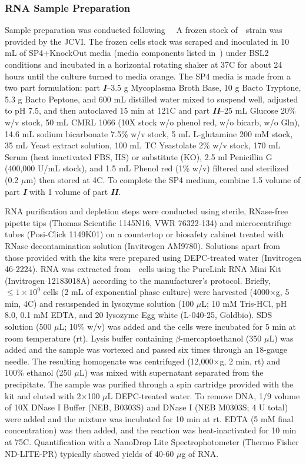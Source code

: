\subsubsection{RNA Sample Preparation} \label{sec:methods-ill-prep}
Sample preparation was conducted following~\cite{Grnberger2019b}~%
A frozen stock of~\syn~strain was provided by the JCVI. The frozen cells stock was scraped and inoculated in 10 mL of SP4+KnockOut media (media components listed in~) under BSL2 conditions and incubated in a horizontal rotating shaker at 37\textdegree C for about 24 hours until the culture turned to media orange. The SP4 media is made from a two part formulation: part \textbf{\textit{I}}--3.5 g Mycoplasma Broth Base, 10 g Bacto Tryptone, 5.3 g Bacto Peptone, and 600 mL distilled water mixed to suspend well, adjusted to pH 7.5, and then autoclaved 15 min at 121\textdegree C and part \textbf{\textit{II}}--25 mL Glucose 20\% w/v stock, 50 mL CMRL 1066 (10X stock w/o phenol red, w/o bicarb, w/o Gln), 14.6 mL sodium bicarbonate 7.5\% w/v stock, 5 mL L-glutamine 200 mM stock, 35 mL Yeast extract solution, 100 mL TC Yeastolate 2\% w/v stock, 170 mL Serum (heat inactivated FBS, HS) or substitute (KO), 2.5 ml Penicillin G (400,000 U/mL stock), and 1.5 mL Phenol red (1\% w/v) filtered and sterilized (0.2 $\mu$m) then stored at 4\textdegree C. To complete the SP4 medium, combine 1.5 volume of part \textbf{\textit{I}} with 1 volume of part \textbf{\textit{II}}.

RNA purification and depletion steps were conducted using sterile, RNase-free pipette tips (Thomas Scientific 1145N16, VWR 76322-134) and microcentrifuge tubes (Posi-Click 1149K01) on a countertop or biosafety cabinet treated with RNase decontamination solution (Invitrogen AM9780). Solutions apart from those provided with the kits were prepared using DEPC-treated water (Invitrogen 46-2224). RNA was extracted from~\jsyn~cells using the PureLink RNA Mini Kit (Invitrogen 12183018A) according to the manufacturer’s protocol. Briefly, $\le1\times10^{9}$ cells (2 mL of exponential phase culture) were harvested (4000$\times$g, 5 min, 4\textdegree C) and resuspended in lysozyme solution (100 $\mu$L; 10 mM Tris-HCl, pH 8.0, 0.1 mM EDTA, and 20  lysozyme Egg white (L-040-25, Goldbio). SDS solution (500 $\mu$L; 10\% w/v) was added and the cells were incubated for 5 min at room temperature (rt). Lysis buffer containing $\beta$-mercaptoethanol (350 $\mu$L) was added and the sample was vortexed and passed six times through an 18-gauge needle. The resulting homogenate was centrifuged (12,000$\times$g, 2 min, rt) and 100\% ethanol (250 $\mu$L) was mixed with supernatant separated from the precipitate. The sample was purified through a spin cartridge provided with the kit and eluted with 2$\times$100 $\mu$L DEPC-treated water. To remove DNA, 1/9 volume of 10X DNase I Buffer (NEB, B0303S) and DNase I (NEB M0303S; 4 U total) were added and the mixture was incubated for 10 min at rt. EDTA (5 mM final concentration) was then added, and the reaction was heat-inactivated for 10 min at 75\textdegree C. Quantification with a NanoDrop Lite Spectrophotometer (Thermo Fisher ND-LITE-PR) typically showed yields of 40-60 $\mu$g of RNA.

